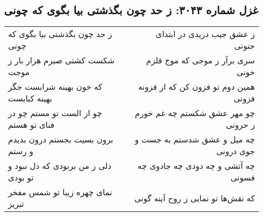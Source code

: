 \begin{center}
\section*{غزل شماره ۳۰۴۳: ز حد چون بگذشتی بیا بگوی که چونی}
\label{sec:3043}
\begin{longtable}{l p{0.5cm} r}
ز حد چون بگذشتی بیا بگوی که چونی
&&
ز عشق جیب دریدی در ابتدای جنونی
\\
شکست کشتی صبرم هزار بار ز موجت
&&
سری برآر ز موجی که موج قلزم خونی
\\
که خون بهینه شرابست جگر بهینه کبابست
&&
همین دوم تو فزون کن که از فزونه فزونی
\\
چو از الست تو مستم چو در فنای تو هستم
&&
چو مهر عشق شکستم چه غم خورم ز حرونی
\\
برون بسیت بجستم درون بدیدم و رستم
&&
چه میل و عشق شدستم به جست و جوی درونی
\\
دلی ز من بربودی که دل نبود و تو بودی
&&
چه آتشی و چه دودی چه جادوی چه فسونی
\\
نمای چهره زیبا تو شمس مفخر تبریز
&&
که نقش‌ها تو نمایی ز روح آینه گونی
\\
\end{longtable}
\end{center}
